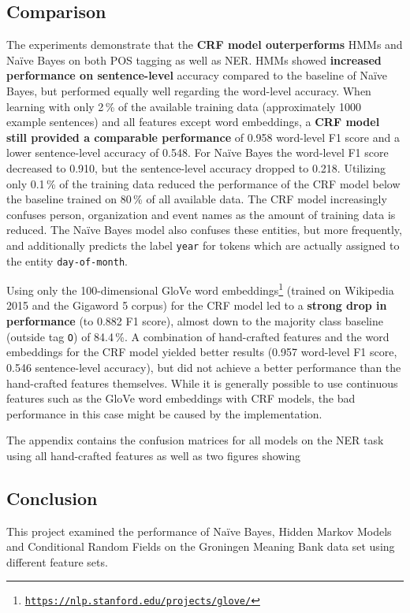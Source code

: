 \documentclass[twocolumns]{IEEEtran}
\begin{document}
\subsection{Comparison}
The experiments demonstrate that the \textbf{CRF model outerperforms} HMMs and Na\"ive Bayes on both POS tagging as well as NER.
HMMs showed \textbf{increased performance on sentence-level} accuracy compared to the baseline of Na\"ive Bayes, but performed equally well regarding the word-level accuracy. When learning with only 2\,\% of the available training data (approximately 1000 example sentences) and all features except word embeddings, a \textbf{CRF model still provided a comparable performance} of 0.958 word-level F1 score and a lower sentence-level accuracy of 0.548. For Na\"ive Bayes the word-level F1 score decreased to 0.910, but the sentence-level accuracy dropped to 0.218. Utilizing only 0.1\,\% of the training data reduced the performance of the CRF model below the baseline trained on 80\,\% of all available data. The CRF model increasingly confuses person, organization and event names as the amount of training data is reduced. The Na\"ive Bayes model also confuses these entities, but more frequently, and additionally predicts the label \texttt{year} for tokens which are actually assigned to the entity \texttt{day-of-month}.

Using only the 100-dimensional GloVe word embeddings\footnote{\texttt{\url{https://nlp.stanford.edu/projects/glove/}}} (trained on Wikipedia 2015 and the Gigaword 5 corpus) for the CRF model led to a \textbf{strong drop in performance} (to 0.882 F1 score), almost down to the majority class baseline (outside tag \texttt{O}) of 84.4\,\%. A combination of hand-crafted features and the word embeddings for the CRF model yielded better results (0.957 word-level F1 score, 0.546 sentence-level accuracy), but did not achieve a better performance than the hand-crafted features themselves. While it is generally possible to use continuous features such as the GloVe word embeddings with CRF models, the bad performance in this case might be caused by the implementation. %

The appendix contains the confusion matrices for all models on the NER task using all hand-crafted features as well as two figures showing 

\enlargethispage{2\baselineskip}
\subsection{Conclusion}
This project examined the performance of Na\"ive Bayes, Hidden Markov Models and Conditional Random Fields on the Groningen Meaning Bank data set using different feature sets.
\end{document}
